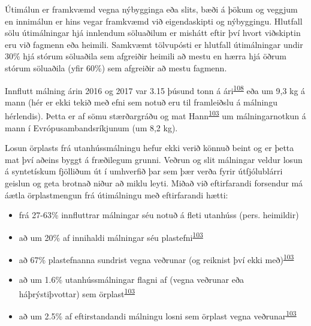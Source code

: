 \documentclass[icelandic,]{book}
\providecommand{\tightlist}{%
  \setlength{\itemsep}{0pt}\setlength{\parskip}{0pt}}
\begin{document}
Útimálun er framkvæmd vegna nýbygginga eða slits, bæði á þökum og veggjum en innimálun er hins vegar framkvæmd við eigendaskipti og nýbyggingu. Hlutfall sölu útimálningar hjá innlendum söluaðilum er mishátt eftir því hvort viðskiptin eru við fagmenn eða heimili.
Samkvæmt tölvupósti er hlutfall útimálningar undir 30\% hjá stórum söluaðila sem afgreiðir heimili að mestu en hærra hjá öðrum stórum söluaðila (yfir 60\%) sem afgreiðir að mestu fagmenn.

Innflutt málning árin 2016 og 2017 var 3.15 þúsund tonn á ári\textsuperscript{\protect\hyperlink{ref-tollur2017}{108}} eða um 9,3 kg á mann (hér er ekki tekið með efni sem notuð eru til framleiðslu á málningu hérlendis). Þetta er af sömu stærðargráðu og mat Hann\textsuperscript{\protect\hyperlink{ref-Hann2018}{103}} um málningarnotkun á mann í Evrópusambandsríkjunum (um 8,2 kg).

Losun örplasts frá utanhússmálningu hefur ekki verið könnuð beint og er þetta mat því aðeins byggt á fræðilegum grunni. Veðrun og slit málningar veldur losun á syntetískum fjölliðum út í umhverfið þar sem þær verða fyrir útfjólublárri geislun og geta brotnað niður að miklu leyti. Miðað við eftirfarandi forsendur má áætla örplastmengun frá útimálningu með eftirfarandi hætti:

\begin{itemize}
\tightlist
\item
  frá 27-63\% innfluttrar málningar séu notuð á fleti utanhúss (pers. heimildir)
\item
  að um 20\% af innihaldi málningar séu plastefni\textsuperscript{\protect\hyperlink{ref-Hann2018}{103}}
\item
  að 67\% plastefnanna sundrist vegna veðrunar (og reiknist því ekki með)\textsuperscript{\protect\hyperlink{ref-Hann2018}{103}}
\item
  að um 1.6\% utanhússmálningar flagni af (vegna veðrunar eða háþrýstiþvottar) sem örplast\textsuperscript{\protect\hyperlink{ref-Hann2018}{103}}
\item
  að um 2.5\% af eftirstandandi málningu losni sem örplast vegna veðrunar\textsuperscript{\protect\hyperlink{ref-Hann2018}{103}}
\end{itemize}
\end{document}
